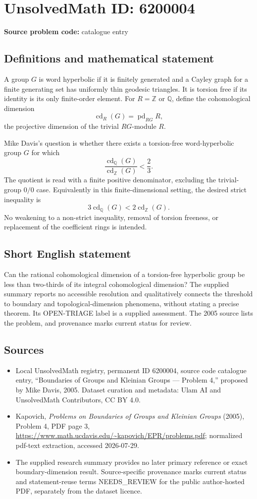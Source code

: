 \documentclass[11pt]{article}
\newcommand{\Z}{\mathbb{Z}}
\newcommand{\Q}{\mathbb{Q}}
\begin{document}
\section*{UnsolvedMath ID: 6200004}
\textbf{Source problem code:} catalogue entry
\subsection{Definitions and mathematical statement}
A group $G$ is word hyperbolic if it is finitely generated and a Cayley graph for a finite generating set has uniformly thin geodesic triangles. It is torsion free if its identity is its only finite-order element. For $R=\Z$ or $\Q$, define the cohomological dimension
\[
 \operatorname{cd}_R(G)=\operatorname{pd}_{RG}R,
\]
the projective dimension of the trivial $RG$-module $R$.

Mike Davis's question is whether there exists a torsion-free word-hyperbolic group $G$ for which
\[
 \frac{\operatorname{cd}_{\Q}(G)}{\operatorname{cd}_{\Z}(G)}<\frac23.
\]
The quotient is read with a finite positive denominator, excluding the trivial-group $0/0$ case. Equivalently in this finite-dimensional setting, the desired strict inequality is
\[
 3\operatorname{cd}_{\Q}(G)<2\operatorname{cd}_{\Z}(G).
\]
No weakening to a non-strict inequality, removal of torsion freeness, or replacement of the coefficient rings is intended.
\subsection{Short English statement}
Can the rational cohomological dimension of a torsion-free hyperbolic group be less than two-thirds of its integral cohomological dimension? The supplied summary reports no accessible resolution and qualitatively connects the threshold to boundary and topological-dimension phenomena, without stating a precise theorem. Its OPEN-TRIAGE label is a supplied assessment. The 2005 source lists the problem, and provenance marks current status for review.
\subsection{Sources}
\begin{itemize}
\item Local UnsolvedMath registry, permanent ID 6200004, source code catalogue entry, ``Boundaries of Groups and Kleinian Groups --- Problem 4,'' proposed by Mike Davis, 2005. Dataset curation and metadata: Ulam AI and UnsolvedMath Contributors, CC BY 4.0.
\item Kapovich, \emph{Problems on Boundaries of Groups and Kleinian Groups} (2005), Problem 4, PDF page 3, \url{https://www.math.ucdavis.edu/~kapovich/EPR/problems.pdf}; normalized pdf-text extraction, accessed 2026-07-29.
\item The supplied research summary provides no later primary reference or exact boundary-dimension result. Source-specific provenance marks current status and statement-reuse terms NEEDS\_REVIEW for the public author-hosted PDF, separately from the dataset licence.
\end{itemize}
\end{document}
